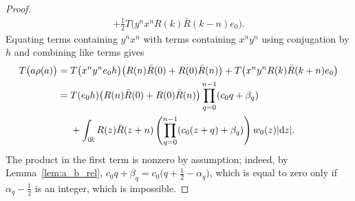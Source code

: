 \documentclass[pdftex]{sigma}
\newcommand\RR{\mathbb{R}}
\renewcommand\d{\mathrm{d}}
\newcommand\R{\bar{R}}
\newcommand\half{\ensuremath{\frac{1}{2}}}
\newcommand\thalf{\ensuremath{\tfrac12}}
\numberwithin{equation}{section}
\theoremstyle{definition}
\begin{document}
\begin{proof}
\begin{align*}
 + \thalf T \bigl( y^n x^n R(k) \R(k - n) e_0 \bigr).
 \end{align*}
 Equating terms containing $y^n x^n$
 with terms containing $x^n y^n$
 using conjugation by $h$
 and combining like terms gives
 \begin{align}
 \label{eq:a_r_a}
 T\bigl( a \rho(a) \bigr)
 ={}& T\bigl( x^n y^n e_0 h \bigr) \bigl(R(n) \R(0) + R(0) \R(n)\bigr)
 + T\bigl( x^n y^n R(k) \R(k + n) e_0 \bigr) \nonumber \\
 ={}& T(e_0 h) \bigl(R(n) \R(0) + R(0) \R(n)\bigr)
 \prod\limits_{q = 0}^{n - 1} (c_0 q + \beta_q) \nonumber\\
 & + \int_{{\rm i}\RR} R(z) \R(z + n)
 \left( \prod\limits_{q = 0}^{n - 1}
 (c_0 (z + q) + \beta_q)\right) w_0 (z) |\d z|.
 \end{align}
 The product 
 in the first term is nonzero by assumption;
 indeed, by Lemma~\ref{lem:a_b_rel},
 $c_0 q + \beta_q = c_0 \bigl(q + \half - \alpha_q\bigr)$,
 which is equal to zero only if $\alpha_q - \half$ is an integer,
 which is impossible.


\end{proof}
\end{document}
